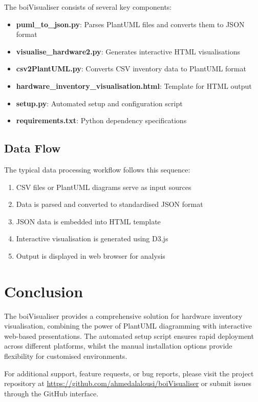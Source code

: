 \documentclass[11pt,a4paper]{article}
\begin{document}
The boiVisualiser consists of several key components:

\begin{itemize}
\item \textbf{puml\_to\_json.py}: Parses PlantUML files and converts them to JSON format
\item \textbf{visualise\_hardware2.py}: Generates interactive HTML visualisations
\item \textbf{csv2PlantUML.py}: Converts CSV inventory data to PlantUML format
\item \textbf{hardware\_inventory\_visualisation.html}: Template for HTML output
\item \textbf{setup.py}: Automated setup and configuration script
\item \textbf{requirements.txt}: Python dependency specifications
\end{itemize}

\subsection{Data Flow}

The typical data processing workflow follows this sequence:

\begin{enumerate}
\item CSV files or PlantUML diagrams serve as input sources
\item Data is parsed and converted to standardised JSON format
\item JSON data is embedded into HTML template
\item Interactive visualisation is generated using D3.js
\item Output is displayed in web browser for analysis
\end{enumerate}

\section{Conclusion}

The boiVisualiser provides a comprehensive solution for hardware inventory visualisation, combining the power of PlantUML diagramming with interactive web-based presentations. The automated setup script ensures rapid deployment across different platforms, whilst the manual installation options provide flexibility for customised environments.

For additional support, feature requests, or bug reports, please visit the project repository at \url{https://github.com/ahmedalalousi/boiVisualiser} or submit issues through the GitHub interface.
\end{document}
